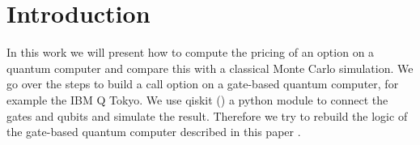 \documentclass[../main.tex]{subfiles}
\begin{document}
\section{Introduction}\label{sec: introduction}
In this work we will present how to compute the pricing of an option on a quantum computer and compare this with a classical Monte Carlo simulation. We go over the steps to build a call option on a gate-based quantum computer, for example the IBM Q Tokyo. We use qiskit (\cite{Qiskit}) a python module to connect the gates and qubits and simulate the result. Therefore we try to rebuild the logic of the gate-based quantum computer described in this paper \cite{1905.02666}.
\biblio
\end{document}
